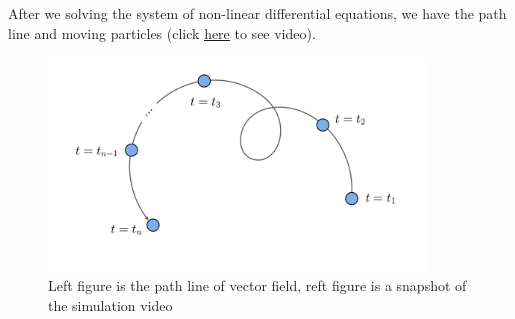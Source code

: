 \documentclass[11pt,]{beamer}
\begin{document}
\begin{frame}
	After we solving the system of non-linear differential equations, we have the path line and moving particles (click \underline{\href{https://youtube.com/shorts/bfFM8ztiRJc?si=1c8Zehqdbq2fMtKz}{here}} to see video). 
	\begin{figure}
	\includegraphics[page=9,width=0.9\textwidth]{imgs.pdf}
    \caption{Left figure is the path line of vector field, reft figure is a snapshot of the simulation video}
	\end{figure}
\end{frame}
\end{document}
